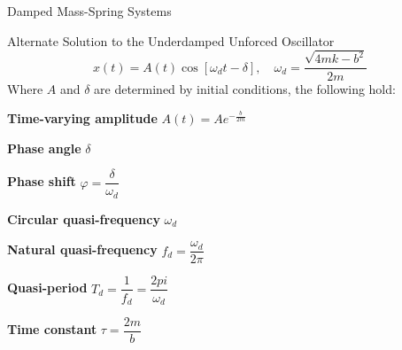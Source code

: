 \documentclass{beamer}
\begin{document}
\begin{frame}{Damped Mass-Spring Systems}
\begin{block}{Alternate Solution to the Underdamped Unforced Oscillator}
\begin{equation*}
x(t)=A(t)\cos[\omega_d t - \delta]
,\quad
\omega_d=\dfrac{\sqrt{4mk-b^2}}{2m}
\end{equation*}
Where $A$ and $\delta$ are determined by initial conditions, the following hold:
\begin{dynitemize}[<+- | alert@+>]
\item\textbf{Time-varying amplitude} $A(t)=Ae^{-\tfrac{b}{2m}}$
\item\textbf{Phase angle} $\delta$
\item\textbf{Phase shift} $\varphi=\dfrac{\delta}{\omega_d}$
\item\textbf{Circular quasi-frequency} $\omega_d$
\item\textbf{Natural quasi-frequency} $f_d=\dfrac{\omega_d}{2\pi}$
\item\textbf{Quasi-period} $T_d=\dfrac{1}{f_d}=\dfrac{2pi}{\omega_d}$
\item\textbf{Time constant} $\tau=\dfrac{2m}{b}$
\end{dynitemize}
\end{block}
\end{frame}
\end{document}
